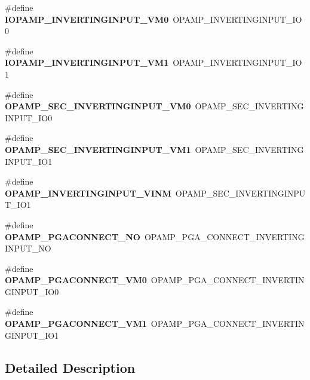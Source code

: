 \begin{DoxyCompactItemize}
\#define {\bfseries I\+O\+P\+A\+M\+P\+\_\+\+I\+N\+V\+E\+R\+T\+I\+N\+G\+I\+N\+P\+U\+T\+\_\+\+V\+M0}~O\+P\+A\+M\+P\+\_\+\+I\+N\+V\+E\+R\+T\+I\+N\+G\+I\+N\+P\+U\+T\+\_\+\+I\+O0
\item 
\mbox{\label{group___h_a_l___o_p_a_m_p___aliased___defines_ga375723a55ef087438b5614070f7daab6}} 
\#define {\bfseries I\+O\+P\+A\+M\+P\+\_\+\+I\+N\+V\+E\+R\+T\+I\+N\+G\+I\+N\+P\+U\+T\+\_\+\+V\+M1}~O\+P\+A\+M\+P\+\_\+\+I\+N\+V\+E\+R\+T\+I\+N\+G\+I\+N\+P\+U\+T\+\_\+\+I\+O1
\item 
\mbox{\label{group___h_a_l___o_p_a_m_p___aliased___defines_ga2deb27c0ae55e51ce5e529b8ca12a5bf}} 
\#define {\bfseries O\+P\+A\+M\+P\+\_\+\+S\+E\+C\+\_\+\+I\+N\+V\+E\+R\+T\+I\+N\+G\+I\+N\+P\+U\+T\+\_\+\+V\+M0}~O\+P\+A\+M\+P\+\_\+\+S\+E\+C\+\_\+\+I\+N\+V\+E\+R\+T\+I\+N\+G\+I\+N\+P\+U\+T\+\_\+\+I\+O0
\item 
\mbox{\label{group___h_a_l___o_p_a_m_p___aliased___defines_ga64e070f02a3a612aa9307cd3d7be8cb9}} 
\#define {\bfseries O\+P\+A\+M\+P\+\_\+\+S\+E\+C\+\_\+\+I\+N\+V\+E\+R\+T\+I\+N\+G\+I\+N\+P\+U\+T\+\_\+\+V\+M1}~O\+P\+A\+M\+P\+\_\+\+S\+E\+C\+\_\+\+I\+N\+V\+E\+R\+T\+I\+N\+G\+I\+N\+P\+U\+T\+\_\+\+I\+O1
\item 
\mbox{\label{group___h_a_l___o_p_a_m_p___aliased___defines_gafe28bec51c15b3c50797e6cb12e271bc}} 
\#define {\bfseries O\+P\+A\+M\+P\+\_\+\+I\+N\+V\+E\+R\+T\+I\+N\+G\+I\+N\+P\+U\+T\+\_\+\+V\+I\+NM}~O\+P\+A\+M\+P\+\_\+\+S\+E\+C\+\_\+\+I\+N\+V\+E\+R\+T\+I\+N\+G\+I\+N\+P\+U\+T\+\_\+\+I\+O1
\item 
\mbox{\label{group___h_a_l___o_p_a_m_p___aliased___defines_gae834f2fc0846277de623320d541d2b83}} 
\#define {\bfseries O\+P\+A\+M\+P\+\_\+\+P\+G\+A\+C\+O\+N\+N\+E\+C\+T\+\_\+\+NO}~O\+P\+A\+M\+P\+\_\+\+P\+G\+A\+\_\+\+C\+O\+N\+N\+E\+C\+T\+\_\+\+I\+N\+V\+E\+R\+T\+I\+N\+G\+I\+N\+P\+U\+T\+\_\+\+NO
\item 
\mbox{\label{group___h_a_l___o_p_a_m_p___aliased___defines_gad9238e09b6c72142f797d4a0cccef921}} 
\#define {\bfseries O\+P\+A\+M\+P\+\_\+\+P\+G\+A\+C\+O\+N\+N\+E\+C\+T\+\_\+\+V\+M0}~O\+P\+A\+M\+P\+\_\+\+P\+G\+A\+\_\+\+C\+O\+N\+N\+E\+C\+T\+\_\+\+I\+N\+V\+E\+R\+T\+I\+N\+G\+I\+N\+P\+U\+T\+\_\+\+I\+O0
\item 
\mbox{\label{group___h_a_l___o_p_a_m_p___aliased___defines_ga8a371a8519c5350bba225e66b4d82ef1}} 
\#define {\bfseries O\+P\+A\+M\+P\+\_\+\+P\+G\+A\+C\+O\+N\+N\+E\+C\+T\+\_\+\+V\+M1}~O\+P\+A\+M\+P\+\_\+\+P\+G\+A\+\_\+\+C\+O\+N\+N\+E\+C\+T\+\_\+\+I\+N\+V\+E\+R\+T\+I\+N\+G\+I\+N\+P\+U\+T\+\_\+\+I\+O1
\end{DoxyCompactItemize}


\subsection{Detailed Description}
